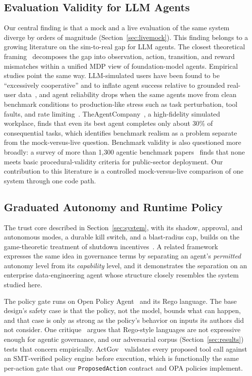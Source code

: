 \subsection{Evaluation Validity for LLM Agents}
Our central finding is that a mock and a live evaluation of the same system diverge by orders of
magnitude (Section~\ref{sec:livemock}). This finding belongs to a growing literature on the
sim-to-real gap for LLM agents. The closest theoretical framing~\cite{liu2026simtoreal} decomposes the
gap into observation, action, transition, and reward mismatches within a unified MDP view of
foundation-model agents. Empirical studies point the same way. LLM-simulated users have been found to
be ``excessively cooperative'' and to inflate agent success relative to grounded real-user
data~\cite{zhu2026realusersim}, and agent reliability drops when the same agents move from clean
benchmark conditions to production-like stress such as task perturbation, tool faults, and rate
limiting~\cite{gupta2026reliabilitybench}. TheAgentCompany~\cite{xu2024agentcompany}, a high-fidelity
simulated workplace, finds that even its best agent completes only about 30\% of consequential tasks,
which identifies benchmark realism as a problem separate from the mock-versus-live question. Benchmark
validity is also questioned more broadly: a survey of more than 1{,}300 agentic benchmark
papers~\cite{rystrom2026agentbenchmarks} finds that none meets basic procedural-validity criteria for
public-sector deployment. Our contribution to this literature is a controlled mock-versus-live
comparison of one system through one code path.

\subsection{Graduated Autonomy and Runtime Policy}
The trust core described in Section~\ref{sec:system}, with its shadow, approval, and autonomous modes,
a durable kill switch, and a blast-radius cap, builds on the game-theoretic treatment of shutdown
incentives~\cite{hadfieldmenell2016offswitch}. A related framework~\cite{zheng2026separating} expresses
the same idea in governance terms by separating an agent's \emph{permitted} autonomy level from its
\emph{capability} level, and it demonstrates the separation on an enterprise data-engineering agent
whose structure closely resembles the system studied here.

The policy gate runs on Open Policy Agent~\cite{opa} and its Rego language. The base design's safety
case is that the policy, not the model, bounds what can happen, and that case is only as strong as the
policy's behavior on inputs its authors did not consider. One critique~\cite{joshi2026deontic} argues
that Rego-style languages are not expressive enough for agentic governance, and our adversarial corpus
(Section~\ref{sec:results}) tests that concern empirically. ActGov~\cite{zhang2026actgov} validates
every proposed tool call against an SMT-verified policy engine before execution, which is functionally
the same per-action gate that our \texttt{ProposedAction} contract and OPA policies implement.

